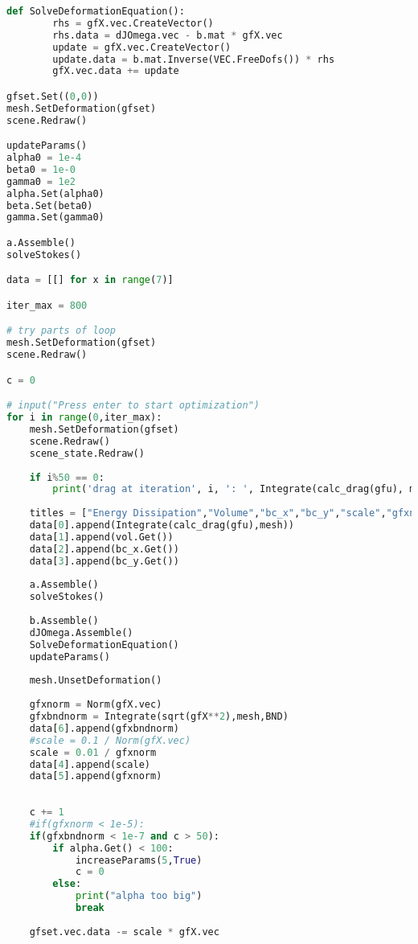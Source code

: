 \begin{appendix}
\begin{lstlisting}[language=Python, title=NGSolve Shape Optimization Code in Python, label=final_code]
        def SolveDeformationEquation():
        rhs = gfX.vec.CreateVector()
        rhs.data = dJOmega.vec - b.mat * gfX.vec
        update = gfX.vec.CreateVector()
        update.data = b.mat.Inverse(VEC.FreeDofs()) * rhs
        gfX.vec.data += update

gfset.Set((0,0))
mesh.SetDeformation(gfset)
scene.Redraw()

updateParams()
alpha0 = 1e-4
beta0 = 1e-0
gamma0 = 1e2
alpha.Set(alpha0)
beta.Set(beta0)
gamma.Set(gamma0)

a.Assemble()
solveStokes()

data = [[] for x in range(7)]

iter_max = 800

# try parts of loop
mesh.SetDeformation(gfset)
scene.Redraw()

c = 0

# input("Press enter to start optimization")
for i in range(0,iter_max):
    mesh.SetDeformation(gfset)
    scene.Redraw()
    scene_state.Redraw()
    
    if i%50 == 0:
        print('drag at iteration', i, ': ', Integrate(calc_drag(gfu), mesh))
        
    titles = ["Energy Dissipation","Volume","bc_x","bc_y","scale","gfxnorm","gfxbndnorm"] # collecting data
    data[0].append(Integrate(calc_drag(gfu),mesh))
    data[1].append(vol.Get())
    data[2].append(bc_x.Get())
    data[3].append(bc_y.Get())
    
    a.Assemble()
    solveStokes()
    
    b.Assemble()
    dJOmega.Assemble()
    SolveDeformationEquation()
    updateParams()
    
    mesh.UnsetDeformation()
    
    gfxnorm = Norm(gfX.vec)
    gfxbndnorm = Integrate(sqrt(gfX**2),mesh,BND)
    data[6].append(gfxbndnorm)
    #scale = 0.1 / Norm(gfX.vec)
    scale = 0.01 / gfxnorm
    data[4].append(scale)
    data[5].append(gfxnorm)
    
    
    c += 1
    #if(gfxnorm < 1e-5):
    if(gfxbndnorm < 1e-7 and c > 50):
        if alpha.Get() < 100:
            increaseParams(5,True)
            c = 0
        else:
            print("alpha too big")
            break
            
    gfset.vec.data -= scale * gfX.vec
\end{lstlisting}

\vfill

\end{appendix}
